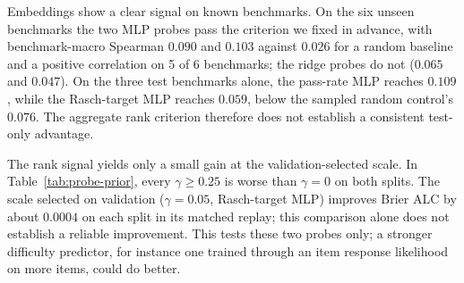 \label{sec:itemfeat-text}
\begin{table}[H]
\centering
\caption{Item-difficulty transfer: within-benchmark Spearman correlation and pairwise accuracy between predicted easiness and observed pass rate, averaged across benchmarks. ID: items held out within the 11 training benchmarks; OOD validation and OOD test: three unseen benchmarks each. The additional pass-rate and Rasch-target probes use benchmark-grouped selection and were not evaluated on ID (--).}
\label{tab:item-difficulty}
\small\setlength{\tabcolsep}{4pt}

\end{table}

Embeddings show a clear signal on known benchmarks. On the six unseen benchmarks the two MLP probes pass the criterion we fixed in advance, with benchmark-macro Spearman $0.090$ and $0.103$ against $0.026$ for a random baseline and a positive correlation on 5 of 6 benchmarks; the ridge probes do not ($0.065$ and $0.047$). On the three test benchmarks alone, the pass-rate MLP reaches $0.109$, while the Rasch-target MLP reaches $0.059$, below the sampled random control's $0.076$. The aggregate rank criterion therefore does not establish a consistent test-only advantage.

The rank signal yields only a small gain at the validation-selected scale. In Table~\ref{tab:probe-prior}, every $\gamma\ge0.25$ is worse than $\gamma=0$ on both splits. The scale selected on validation ($\gamma=0.05$, Rasch-target MLP) improves Brier ALC by about $0.0004$ on each split in its matched replay; this comparison alone does not establish a reliable improvement. This tests these two probes only; a stronger difficulty predictor, for instance one trained through an item response likelihood on more items, could do better.

\begin{table}[H]
\centering
\caption{Predicted item difficulty as the prior mean of the Rasch item deviation, Equation~\eqref{eq:probe-prior}. Cells are $\Delta_{m-\mathrm{J}}$ of the fitted Rasch with scale $\gamma$, competition-shaped draws; $\gamma=0$ is the fitted Rasch without a prior mean. Bold: lowest in each column.}
\label{tab:probe-prior}

\end{table}

